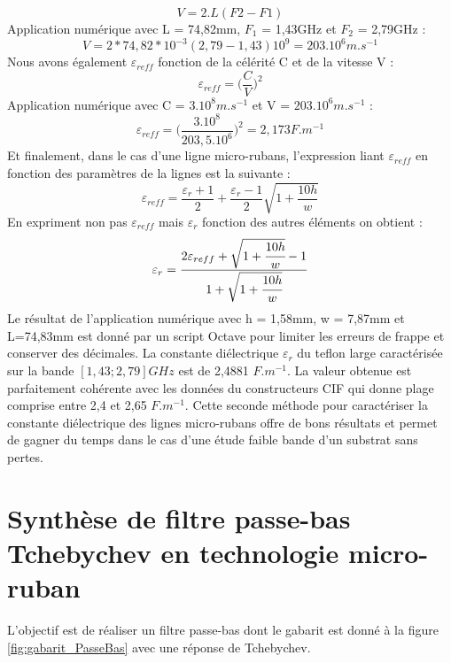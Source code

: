 \documentclass[french]{article}
\begin{document}
\begin{equation}
V=2.L(F2-F1) 
\end{equation}
Application numérique avec L = 74,82mm, $F_1$ = 1,43GHz et $F_2$ = 2,79GHz :
\begin{equation}
V= 2*74,82*10^{-3}(2,79-1,43)10^9=203.10^6m.s^{-1}
\end{equation}
Nous avons également $\varepsilon_{reff}$ fonction de la célérité C et de la vitesse V :
\begin{equation}
\varepsilon_{reff} = \Big(\frac{C}{V}\Big)^2
\end{equation}
Application numérique avec C = $3.10^8m.s^{-1}$ et V = $203.10^6m.s^{-1}$ :
\begin{equation}
\varepsilon_{reff} = \Big(\frac{3.10^8}{203,5.10^6}\Big)^2=2,173 F.m^{-1}
\end{equation}
Et finalement, dans le cas d'une ligne micro-rubans, l'expression liant $\varepsilon_{reff}$ en fonction des paramètres de la lignes est la suivante :
\begin{equation}
	\varepsilon_{reff} = \frac{\varepsilon_r+1}{2}+\frac{\varepsilon_r-1}{2}\sqrt{1+\frac{10h}{w}}
\end{equation}
En expriment non pas $\varepsilon_{reff}$ mais $\varepsilon_{r}$ fonction des autres éléments on obtient : 
\begin{equation}
\varepsilon_{r} = \frac{2\varepsilon_{reff} + \sqrt{1 + \cfrac{10h}{w}} - 1}{1 + \sqrt{1 + \cfrac{10h}{w}}}
\end{equation}
Le résultat de l'application numérique avec h = 1,58mm, w = 7,87mm et L=74,83mm est donné par un script Octave pour limiter les erreurs de frappe et conserver des décimales. La constante diélectrique $\varepsilon_{r}$ du teflon large caractérisée sur la bande $[1,43;2,79]GHz$ est de 2,4881 $F.m^{-1}$. La valeur obtenue est parfaitement cohérente avec les données du constructeurs CIF qui donne plage comprise entre 2,4 et 2,65 $F.m^{-1}$. Cette seconde méthode pour caractériser la constante diélectrique des lignes micro-rubans offre de bons résultats et permet de gagner du temps dans le cas d'une étude faible bande d'un substrat sans pertes.



\section{Synthèse de filtre passe-bas Tchebychev en technologie micro-ruban}


L'objectif est de réaliser un filtre passe-bas dont le gabarit est donné à la figure \ref{fig:gabarit_PasseBas} avec une réponse de Tchebychev.
\end{document}
